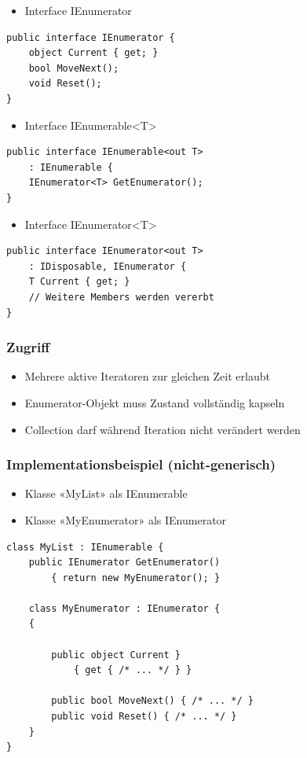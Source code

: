 \begin{itemize}
    \item Interface IEnumerator
\end{itemize}
\begin{lstlisting}
public interface IEnumerator {
    object Current { get; }
    bool MoveNext();
    void Reset();
}
\end{lstlisting}

\begin{itemize}
    \item Interface IEnumerable<T>
\end{itemize}
\begin{lstlisting}
public interface IEnumerable<out T>
    : IEnumerable {
    IEnumerator<T> GetEnumerator();
}
\end{lstlisting}

\begin{itemize}
    \item Interface IEnumerator<T>
\end{itemize}
\begin{lstlisting}
public interface IEnumerator<out T>
    : IDisposable, IEnumerator {
    T Current { get; }
    // Weitere Members werden vererbt
}
\end{lstlisting}


\subsubsection{Zugriff}
\begin{itemize}
    \item Mehrere aktive Iteratoren zur gleichen Zeit erlaubt
    \item Enumerator-Objekt muss Zustand vollständig kapseln
    \item Collection darf während Iteration nicht verändert werden
\end{itemize}


\subsubsection{Implementationsbeispiel (nicht-generisch)}
\begin{itemize}
    \item Klasse «MyList» als IEnumerable
    \item Klasse «MyEnumerator» als IEnumerator
\end{itemize}
\begin{lstlisting}
class MyList : IEnumerable {
    public IEnumerator GetEnumerator()
        { return new MyEnumerator(); }

    class MyEnumerator : IEnumerator {
    {

        public object Current }
            { get { /* ... */ } }

        public bool MoveNext() { /* ... */ }
        public void Reset() { /* ... */ }
    }
}
\end{lstlisting}

